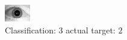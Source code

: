 \begin{figure}[h!]
\begin{center}
\includegraphics[width=0.60\columnwidth]{figures/ID1747_class_3_target_2.png}
\end{center}
\caption{ Classification: 3 actual target: 2}
\label{fig:ID1747_class_3_target_2}
\end{figure}
